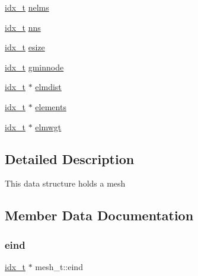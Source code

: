 \begin{DoxyCompactItemize}
\item 
\hyperlink{3rd_party_2parmetis-4_80_83_2metis_2include_2metis_8h_aaa5262be3e700770163401acb0150f52}{idx\+\_\+t} \hyperlink{structmesh__t_ad2c11f70ee4b511bd158dbd38f46fc14}{nelms}
\item 
\hyperlink{3rd_party_2parmetis-4_80_83_2metis_2include_2metis_8h_aaa5262be3e700770163401acb0150f52}{idx\+\_\+t} \hyperlink{structmesh__t_abf9cfafc4af9ca5ac76785bc2c849780}{nns}
\item 
\hyperlink{3rd_party_2parmetis-4_80_83_2metis_2include_2metis_8h_aaa5262be3e700770163401acb0150f52}{idx\+\_\+t} \hyperlink{structmesh__t_abec9334407d17d3f681fe82e5f0ae157}{esize}
\item 
\hyperlink{3rd_party_2parmetis-4_80_83_2metis_2include_2metis_8h_aaa5262be3e700770163401acb0150f52}{idx\+\_\+t} \hyperlink{structmesh__t_aae7efc9e003a2c4da4a50040e503c488}{gminnode}
\item 
\hyperlink{3rd_party_2parmetis-4_80_83_2metis_2include_2metis_8h_aaa5262be3e700770163401acb0150f52}{idx\+\_\+t} $\ast$ \hyperlink{structmesh__t_aea78593f8f3ecb6e3ca87c9831812db3}{elmdist}
\item 
\hyperlink{3rd_party_2parmetis-4_80_83_2metis_2include_2metis_8h_aaa5262be3e700770163401acb0150f52}{idx\+\_\+t} $\ast$ \hyperlink{structmesh__t_aa69fab4095fa702868b0f40eb79d8e00}{elements}
\item 
\hyperlink{3rd_party_2parmetis-4_80_83_2metis_2include_2metis_8h_aaa5262be3e700770163401acb0150f52}{idx\+\_\+t} $\ast$ \hyperlink{structmesh__t_ace3783c80f252853712db84524c47c4a}{elmwgt}
\end{DoxyCompactItemize}


\subsection{Detailed Description}
This data structure holds a mesh 

\subsection{Member Data Documentation}
\mbox{\label{structmesh__t_aea23f507e73665abf78ffc3ecc540210}} 
\subsubsection{\texorpdfstring{eind}{eind}}
{\footnotesize\ttfamily \hyperlink{3rd_party_2parmetis-4_80_83_2metis_2include_2metis_8h_aaa5262be3e700770163401acb0150f52}{idx\+\_\+t} $\ast$ mesh\+\_\+t\+::eind}

